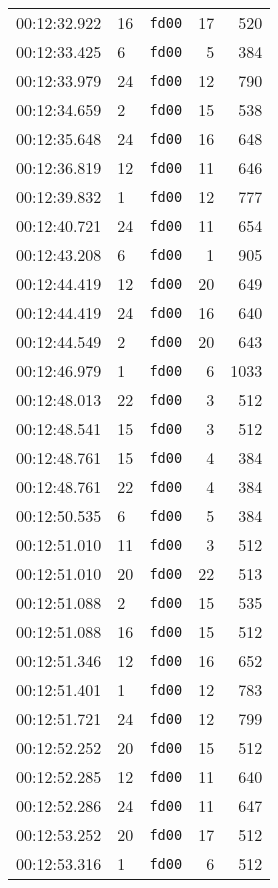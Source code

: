 \documentclass{article}
\begin{document}
\begin{longtable}{lllrr}
00:12:32.922 & 16 & \texttt{fd00} & 17 & 520 \\
00:12:33.425 & 6 & \texttt{fd00} & 5 & 384 \\
00:12:33.979 & 24 & \texttt{fd00} & 12 & 790 \\
00:12:34.659 & 2 & \texttt{fd00} & 15 & 538 \\
00:12:35.648 & 24 & \texttt{fd00} & 16 & 648 \\
00:12:36.819 & 12 & \texttt{fd00} & 11 & 646 \\
00:12:39.832 & 1 & \texttt{fd00} & 12 & 777 \\
00:12:40.721 & 24 & \texttt{fd00} & 11 & 654 \\
00:12:43.208 & 6 & \texttt{fd00} & 1 & 905 \\
00:12:44.419 & 12 & \texttt{fd00} & 20 & 649 \\
00:12:44.419 & 24 & \texttt{fd00} & 16 & 640 \\
00:12:44.549 & 2 & \texttt{fd00} & 20 & 643 \\
00:12:46.979 & 1 & \texttt{fd00} & 6 & 1033 \\
00:12:48.013 & 22 & \texttt{fd00} & 3 & 512 \\
00:12:48.541 & 15 & \texttt{fd00} & 3 & 512 \\
00:12:48.761 & 15 & \texttt{fd00} & 4 & 384 \\
00:12:48.761 & 22 & \texttt{fd00} & 4 & 384 \\
00:12:50.535 & 6 & \texttt{fd00} & 5 & 384 \\
00:12:51.010 & 11 & \texttt{fd00} & 3 & 512 \\
00:12:51.010 & 20 & \texttt{fd00} & 22 & 513 \\
00:12:51.088 & 2 & \texttt{fd00} & 15 & 535 \\
00:12:51.088 & 16 & \texttt{fd00} & 15 & 512 \\
00:12:51.346 & 12 & \texttt{fd00} & 16 & 652 \\
00:12:51.401 & 1 & \texttt{fd00} & 12 & 783 \\
00:12:51.721 & 24 & \texttt{fd00} & 12 & 799 \\
00:12:52.252 & 20 & \texttt{fd00} & 15 & 512 \\
00:12:52.285 & 12 & \texttt{fd00} & 11 & 640 \\
00:12:52.286 & 24 & \texttt{fd00} & 11 & 647 \\
00:12:53.252 & 20 & \texttt{fd00} & 17 & 512 \\
00:12:53.316 & 1 & \texttt{fd00} & 6 & 512 \\

\end{longtable}
\end{document}
